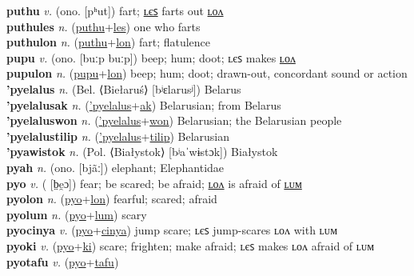 \textbf{puthu} \textit{v.} (ono. [pʰut])
fart; \hyperref[puthules]{ʟєꜱ} farts out \hyperref[puthulon]{ʟᴏᴧ} \label{puthu} \\
\textbf{puthules} \textit{n.} (\hyperref[puthu]{puthu}+\hyperref[les]{les})
one who farts \label{puthules} \\
\textbf{puthulon} \textit{n.} (\hyperref[puthu]{puthu}+\hyperref[lon]{lon})
fart; flatulence \label{puthulon} \\
\textbf{pupu} \textit{v.} (ono. [buːp buːp])
beep; hum; doot; ʟєꜱ makes \hyperref[pupulon]{ʟᴏᴧ} \label{pupu} \\
\textbf{pupulon} \textit{n.} (\hyperref[pupu]{pupu}+\hyperref[lon]{lon})
beep; hum; doot; drawn-out, concordant sound or action \label{pupulon} \\
\textbf{'pyelalus} \textit{n.} (Bel. ⟨Biełaruś⟩ [bʲɛlarusʲ])
Belarus \label{'pyelalus} \\
\textbf{'pyelalusak} \textit{n.} (\hyperref['pyelalus]{'pyelalus}+\hyperref[ak]{ak})
Belarusian; from Belarus \label{'pyelalusak} \\
\textbf{'pyelaluswon} \textit{n.} (\hyperref['pyelalus]{'pyelalus}+\hyperref[won]{won})
Belarusian; the Belarusian people \label{'pyelaluswon} \\
\textbf{'pyelalustilip} \textit{n.} (\hyperref['pyelalus]{'pyelalus}+\hyperref[tilip]{tilip})
Belarusian \label{'pyelalustilip} \\
\textbf{'pyawistok} \textit{n.} (Pol. ⟨Białystok⟩ [bʲaˈwɨstɔk])
Białystok \label{'pyawistok} \\
\textbf{pyah} \textit{n.} (ono. [bjãː])
elephant; Elephantidae \label{pyah} \\
\textbf{pyo} \textit{v.} ( [b̤e̯ɔ])
fear; be scared; be afraid; \hyperref[pyolon]{ʟᴏᴧ} is afraid of \hyperref[pyolum]{ʟᴜᴍ} \label{pyo} \\
\textbf{pyolon} \textit{n.} (\hyperref[pyo]{pyo}+\hyperref[lon]{lon})
fearful; scared; afraid \label{pyolon} \\
\textbf{pyolum} \textit{n.} (\hyperref[pyo]{pyo}+\hyperref[lum]{lum})
scary \label{pyolum} \\
\textbf{pyocinya} \textit{v.} (\hyperref[pyo]{pyo}+\hyperref[cinya]{cinya})
jump scare; ʟєꜱ jump-scares ʟᴏᴧ with ʟᴜᴍ \label{pyocinya} \\
\textbf{pyoki} \textit{v.} (\hyperref[pyo]{pyo}+\hyperref[ki]{ki})
scare; frighten; make afraid; ʟєꜱ makes ʟᴏᴧ afraid of ʟᴜᴍ \label{pyoki} \\
\textbf{pyotafu} \textit{v.} (\hyperref[pyo]{pyo}+\hyperref[tafu]{tafu})
